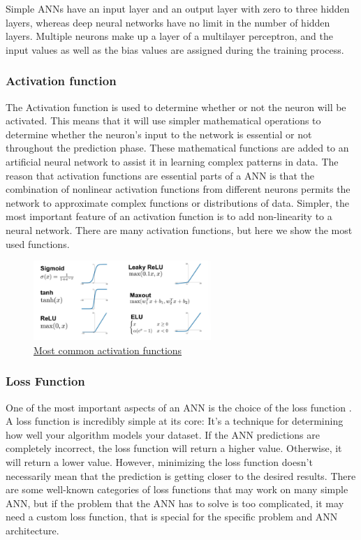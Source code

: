 Simple ANNs have an input layer and an output layer with zero to three hidden layers, whereas deep neural networks have no limit in the number of hidden layers. Multiple neurons make up a layer of a multilayer perceptron, and the input values as well as the bias values are assigned
during the training process.



\subsubsection*{Activation function}
The Activation function is used to determine whether or not the neuron will be activated. This means that it will use simpler mathematical operations to determine whether the neuron's input to the network is essential or not throughout the prediction phase. These mathematical functions are added to an artificial neural network to assist it in learning complex patterns in data. The reason that activation functions are essential parts of a ANN is that the combination of nonlinear activation functions from different neurons permits the network to approximate complex functions or distributions of data. Simpler, the most important feature of an activation function is to add non-linearity to a neural network. There are many activation functions, but here we show the most used functions.

 \begin{figure}[h]
	\centering
	\includegraphics[width=0.6\textwidth]{figures/background/ActivationFunctions.png}
	\caption{\href{https://datasciencepreparation.com/blog/articles/what-is-an-activation-function-what-are-commonly-used-activation-functions/}
	{Most common activation functions}}
\end{figure}

\pagebreak

\subsubsection*{Loss Function}

One of the most important aspects of an ANN is the choice of the loss function \cite{The importance of the loss function in option valuation} . A loss function is incredibly simple at its core: It's a technique for determining how well your algorithm models your dataset. If the ANN predictions are completely incorrect, the loss function will return a higher value. Otherwise, it will return a lower value. However, minimizing the loss function doesn't necessarily mean that the prediction is getting closer to the desired results. There are some well-known categories of loss functions that may work on many simple ANN, but if the problem that the ANN has to solve is too complicated, it may need a custom loss function, that is special for the specific problem and ANN architecture. \\

